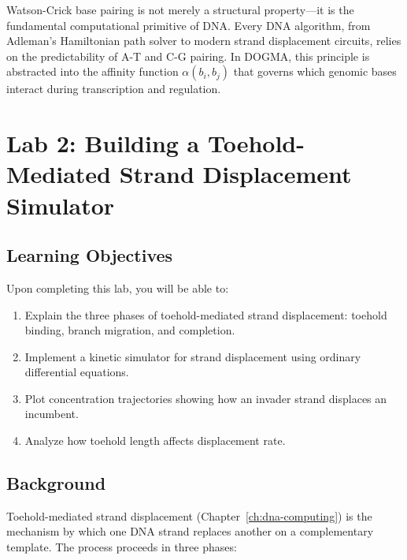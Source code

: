 \begin{bioinsight}
Watson-Crick base pairing is not merely a structural property---it is the fundamental computational primitive of DNA. Every DNA algorithm, from Adleman's Hamiltonian path solver to modern strand displacement circuits, relies on the predictability of A-T and C-G pairing. In DOGMA, this principle is abstracted into the affinity function $\alpha(b_i, b_j)$ that governs which genomic bases interact during transcription and regulation.
\end{bioinsight}


\section{Lab 2: Building a Toehold-Mediated Strand Displacement Simulator}
\label{sec:lab2-strand-displacement}

\subsection{Learning Objectives}

Upon completing this lab, you will be able to:
\begin{enumerate}[leftmargin=1.8em]
  \item Explain the three phases of toehold-mediated strand displacement: toehold binding, branch migration, and completion.
  \item Implement a kinetic simulator for strand displacement using ordinary differential equations.
  \item Plot concentration trajectories showing how an invader strand displaces an incumbent.
  \item Analyze how toehold length affects displacement rate.
\end{enumerate}

\subsection{Background}

Toehold-mediated strand displacement (Chapter~\ref{ch:dna-computing}) is the mechanism by which one DNA strand replaces another on a complementary template. The process proceeds in three phases:

